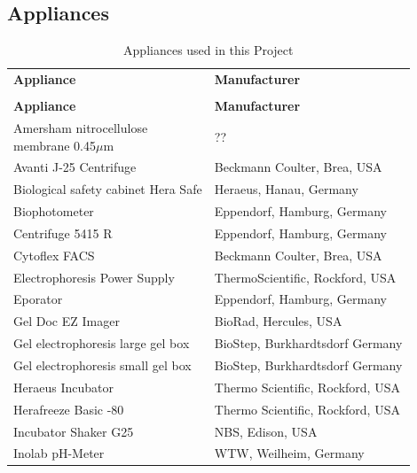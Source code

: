 \subsection{Appliances}

\begin{longtable}{L{0.45\linewidth} R{0.45\linewidth}}
\caption{Appliances used in this Project}
\label{tab:devices}
\\
\toprule
{}
\textbf{Appliance}& \textbf{Manufacturer}\\                           
\midrule
\endfirsthead
{}
\caption[]{Appliances used in this Project}
\\
\midrule
{}
\textbf{Appliance}& \textbf{Manufacturer}\\ 
\midrule
\endhead
\bottomrule
\endfoot
Amersham nitrocellulose membrane 0.45\(\mu\)m & ?? \\
Avanti J-25 Centrifuge                    & Beckmann Coulter, Brea, USA          \\
Biological safety cabinet Hera Safe       & Heraeus, Hanau, Germany              \\
Biophotometer                             & Eppendorf, Hamburg, Germany          \\
Centrifuge 5415 R                         & Eppendorf, Hamburg, Germany          \\
Cytoflex FACS                             & Beckmann Coulter, Brea, USA          \\
Electrophoresis Power Supply              & ThermoScientific, Rockford, USA     \\
Eporator                                  & Eppendorf, Hamburg, Germany         \\
Gel Doc EZ Imager                         & BioRad, Hercules, USA                \\
Gel electrophoresis large gel box         & BioStep, Burkhardtsdorf Germany       \\
Gel electrophoresis small gel box         & BioStep, Burkhardtsdorf Germany       \\
Heraeus Incubator                         & Thermo Scientific, Rockford, USA      \\
Herafreeze Basic -80                      & Thermo Scientific, Rockford, USA      \\
Incubator Shaker G25                      & NBS, Edison, USA                      \\
Inolab pH-Meter                           & WTW, Weilheim, Germany                \\

\end{longtable}
